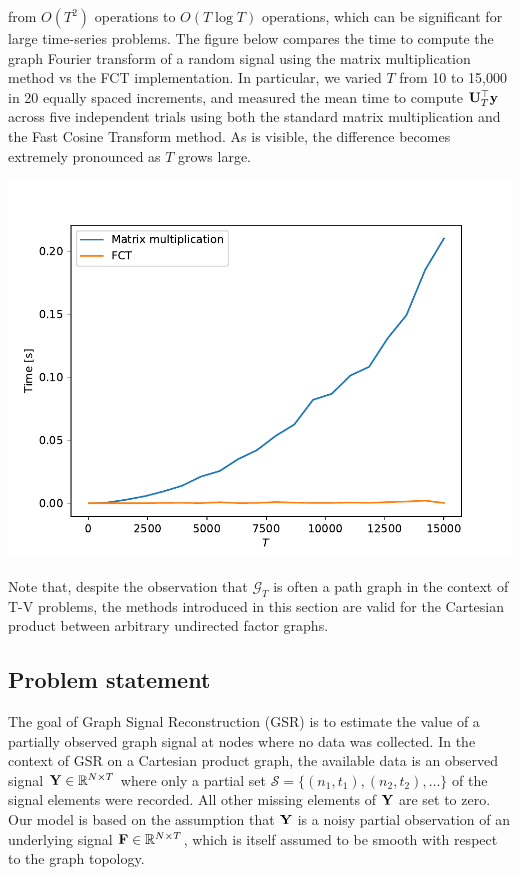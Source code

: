 {    from $O(T^2)$ operations to $O(T \log T)$ operations, which can be significant for large time-series problems. The figure below compares the time to compute the graph Fourier transform of a random signal using the matrix multiplication method vs the FCT implementation. In particular, we varied $T$ from 10 to 15,000 in 20 equally spaced increments, and measured the mean time to compute $\mathbf{U}_T^\top \mathbf{y}$ across five independent trials using both the standard matrix multiplication and the Fast Cosine Transform method. As is visible, the difference becomes extremely pronounced as $T$ grows large.

    \begin{center}
        \includegraphics[width=0.9\linewidth]{Figures/DCT.pdf}
    \end{center}



}



Note that, despite the observation that $\mathcal{G}_T$ is often a path graph in the context of T-V problems, the methods introduced in this section are valid for the Cartesian product between arbitrary undirected factor graphs.

\subsection{Problem statement}

\label{sec:problem_statement_2d}


The goal of Graph Signal Reconstruction (GSR) is to estimate the value of a partially observed graph signal at nodes where no data was collected. In the context of GSR on a Cartesian product graph, the available data is an observed signal $\mathbf{Y} \in \mathbb{R}^{N \times T}$ where only a partial set $\mathcal{S} = \{(n_1, t_1), (n_2, t_2), \dots \}$ of the signal elements were recorded. All other missing elements of $\mathbf{Y}$ are set to zero. Our model is based on the assumption that $\mathbf{Y}$ is a noisy partial observation of an underlying signal $\mathbf{F} \in \mathbb{R}^{N \times T}$, which is itself assumed to be smooth with respect to the graph topology.

